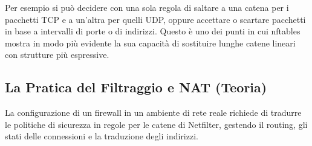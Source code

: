 \documentclass[12pt, a4paper]{report}
\begin{document}
Per esempio si può decidere con una sola regola di saltare a una catena per i pacchetti TCP e a un'altra per quelli UDP, oppure accettare o scartare pacchetti in base a intervalli di porte o di indirizzi. Questo è uno dei punti in cui nftables mostra in modo più evidente la sua capacità di sostituire lunghe catene lineari con strutture più espressive.

\subsection{La Pratica del Filtraggio e NAT (Teoria)}
La configurazione di un firewall in un ambiente di rete reale richiede di tradurre le politiche di sicurezza in regole per le catene di Netfilter, gestendo il routing, gli stati delle connessioni e la traduzione degli indirizzi.
\end{document}
